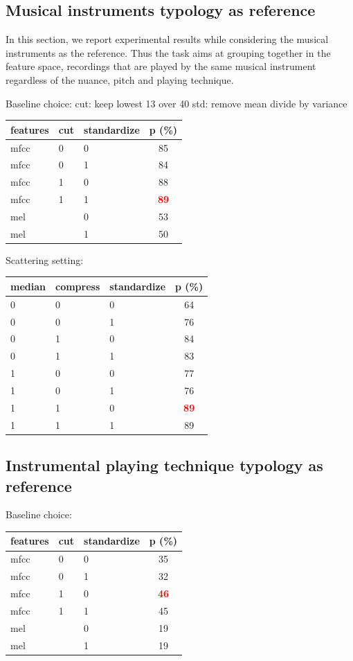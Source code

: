 \documentclass{article}
\begin{document}

\subsection{Musical instruments typology as reference}

In this section, we report experimental results while considering the musical instruments as the reference. Thus the task aims at grouping together in the feature space, recordings that are played by the same musical instrument regardless of the nuance, pitch and playing technique.

Baseline choice:
cut: keep lowest 13 over 40
std: remove mean divide by variance
\begin{tabular}{lllc}
features & cut & standardize & p (\%) \\
\hline
mfcc & 0 & 0 & 85 \\
mfcc & 0 & 1 & 84 \\
mfcc & 1 & 0 & 88 \\
mfcc & 1 & 1 & \textbf{\textcolor{red}{89}} \\
mel &  & 0 & 53 \\
mel &  & 1 & 50 \\
\end{tabular}

Scattering setting:
\begin{tabular}{lllc}
median & compress & standardize & p (\%) \\
\hline
0 & 0 & 0 & 64 \\
0 & 0 & 1 & 76 \\
0 & 1 & 0 & 84 \\
0 & 1 & 1 & 83 \\
1 & 0 & 0 & 77 \\
1 & 0 & 1 & 76 \\
1 & 1 & 0 & \textbf{\textcolor{red}{89}} \\
1 & 1 & 1 & 89 \\
\end{tabular}


\subsection{Instrumental playing technique typology as reference}

Baseline choice:
\begin{tabular}{lllc}
features & cut & standardize & p (\%) \\
\hline
mfcc & 0 & 0 & 35 \\
mfcc & 0 & 1 & 32 \\
mfcc & 1 & 0 & \textbf{\textcolor{red}{46}} \\
mfcc & 1 & 1 & 45 \\
mel &  & 0 & 19 \\
mel &  & 1 & 19 \\
\end{tabular}
\end{document}
